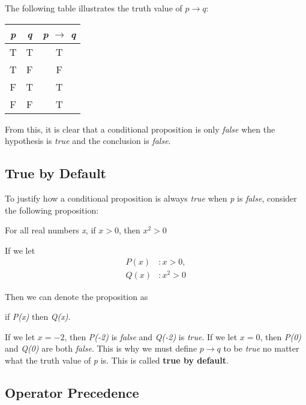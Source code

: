 The following table illustrates the truth value of $p \rightarrow q$:

\begin{table}[h]
\centering
\begin{tabular}{|c|c|c|}
\hline
\textit{p} & \textit{q} & \textit{p} $\rightarrow$ \textit{q} \\ \hline
T          & T          & T       \\ \hline
T          & F          & F       \\ \hline
F          & T          & T       \\ \hline
F          & F          & T       \\ \hline
\end{tabular}
\end{table}

From this, it is clear that a conditional proposition is only \textit{false} when the hypothesis is \textit{true} and the conclusion is \textit{false}.\\  

\subsection*{True by Default}

To justify how a conditional proposition is always \textit{true} when \textit{p} is \textit{false}, consider the following proposition:
\begin{center}
    For all real numbers \textit{x}, if $x > 0$, then $x^2 > 0$
\end{center}

If we let
\begin{align*}
    P(x)&: x > 0,\\
    Q(x)&: x^2 > 0
\end{align*}

Then we can denote the proposition as
\begin{center}
    if \textit{P(x)} then \textit{Q(x)}.
\end{center}

If we let $x = -2$, then \textit{P(-2)} is \textit{false} and \textit{Q(-2)} is \textit{true}.  If we let $x = 0$, then \textit{P(0)} and \textit{Q(0)} are both \textit{false}.  This is why we must define $p \rightarrow q$ to be \textit{true} no matter what the truth value of \textit{p} is.  This is called \textbf{true by default}.

\subsection*{Operator Precedence}

